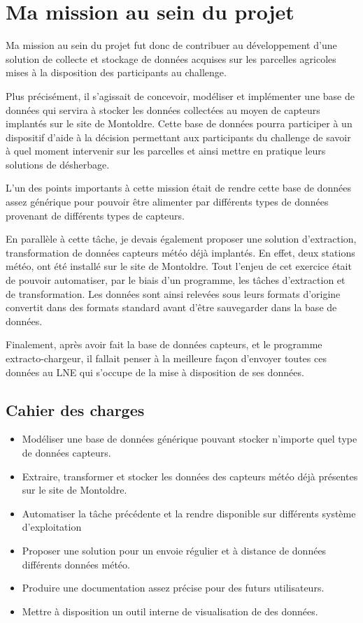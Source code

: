 \section{Ma mission au sein du projet}
Ma mission au sein du projet fut donc de contribuer au développement d’une solution de collecte et stockage de données acquises sur les parcelles agricoles mises à la disposition des participants au challenge. 

Plus précisément, il s’agissait de concevoir, modéliser et implémenter une base de données qui servira à stocker les données collectées au moyen de capteurs implantés sur le site de Montoldre. Cette base de données pourra participer à un dispositif d’aide à la décision permettant aux participants du challenge de savoir à quel moment intervenir sur les parcelles et ainsi mettre en pratique leurs solutions de désherbage.  

L’un des points importants à cette mission était de rendre cette base de données assez générique pour pouvoir être alimenter par différents types de données provenant de différents types de capteurs. 

En parallèle à cette tâche, je devais également proposer une solution d’extraction, transformation de données capteurs météo déjà implantés. En effet, deux stations météo, ont été installé sur le site de Montoldre. Tout l’enjeu de cet exercice était de pouvoir automatiser, par le biais d’un programme, les tâches d’extraction et de transformation. Les données sont ainsi relevées sous leurs formats d’origine convertit dans des formats standard avant d’être sauvegarder dans la base de données. 

Finalement, après avoir fait la base de données capteurs, et le programme extracto-chargeur, il fallait penser à la meilleure façon d’envoyer toutes ces données au LNE qui s’occupe de la mise à disposition de ses données. 

 
\subsection{Cahier des charges}
 \begin{itemize}
      \item Modéliser une base de données générique pouvant stocker n’importe quel type de données capteurs. 
     \item Extraire, transformer et stocker les données des capteurs météo déjà présentes sur le site de Montoldre.
     \item Automatiser la tâche précédente et la rendre disponible sur différents système d’exploitation 
     \item Proposer une solution pour un envoie régulier et à distance de données différents données météo. 
     \item Produire une documentation assez précise pour des futurs utilisateurs. 
     \item Mettre à disposition un outil interne de visualisation de des données. 
 \end{itemize}

